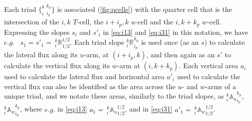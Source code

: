 \documentclass[../tex_main/NEMO_manual]{subfiles}
\begin{document}
Each triad $\{_i^{k}\:_{i_p}^{k_p}\}$ is associated (\autoref{fig:qcells}) with the quarter cell that is
the intersection of the $i,k$ $T$-cell, the $i+i_p,k$ $u$-cell and the $i,k+k_p$ $w$-cell.
Expressing the slopes $s_i$ and $s'_i$ in \autoref{eq:i13} and \autoref{eq:i31} in this notation,
we have $e.g.$ \ $s_1=s'_1={\:}_i^k \mathbb{R}_{1/2}^{1/2}$.
Each triad slope $_i^k\mathbb{R}_{i_p}^{k_p}$ is used once (as an $s$) to
calculate the lateral flux along its $u$-arm, at $(i+i_p,k)$,
and then again as an $s'$ to calculate the vertical flux along its $w$-arm at $(i,k+k_p)$.
Each vertical area $a_i$ used to calculate the lateral flux and horizontal area $a'_i$ used to
calculate the vertical flux can also be identified as the area across the $u$- and $w$-arms of a unique triad,
and we notate these areas, similarly to the triad slopes,
as $_i^k{\mathbb{A}_u}_{i_p}^{k_p}$, $_i^k{\mathbb{A}_w}_{i_p}^{k_p}$,
where $e.g.$ in \autoref{eq:i13} $a_{1}={\:}_i^k{\mathbb{A}_u}_{1/2}^{1/2}$,
and in \autoref{eq:i31} $a'_{1}={\:}_i^k{\mathbb{A}_w}_{1/2}^{1/2}$.
\end{document}
